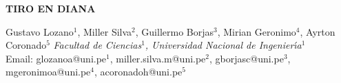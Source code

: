 \documentclass[12pt,a4paper]{article}
\begin{document}
\begin{center}
 {\Large \textbf{TIRO EN DIANA}}
\end{center}
\begin{center}
 Gustavo Lozano$^{1}$, Miller Silva$^{2}$, Guillermo Borjas$^{3}$, Mirian Geronimo$^{4}$, Ayrton Coronado$^{5}$ \vskip5pt
 {\it Facultad de Ciencias$^1$, Universidad Nacional de Ingenier\'{\i}a$^1$\\}\vskip5pt
 Email: glozanoa@uni.pe$^{1}$, miller.silva.m@uni.pe$^{2}$, gborjasc@uni.pe$^{3}$, mgeronimoa@uni.pe$^{4}$, acoronadoh@uni.pe$^{5}$
\end{center}
\vspace*{1cm}
\begin{abstract}


\end{abstract}
\end{document}
